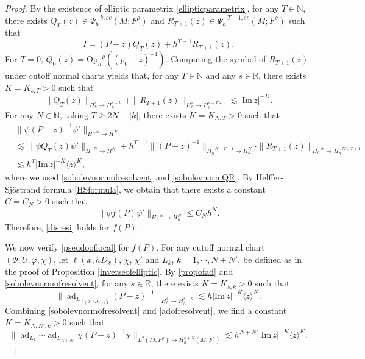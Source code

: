 \documentclass[10pt,a4paper]{amsart}
\newcommand\N{\ensuremath{\mathbb{N}}}
\newcommand\Oph{\ensuremath{\mathrm{Op}_h}}
\newcommand\R{\ensuremath{\mathbb{R}}}
\begin{document}
\begin{proof}
By the existence of elliptic parametrix \eqref{ellipticparametrix}, for any $T\in \mathbb{N}$, there exists $Q_{T}(z) \in \Psi^{-k,sc}_{h}(M;F^\rho)$ and $R_{T+1}(z) \in \Psi^{-T-1,sc}_h(M;F^\rho)$ such that
\begin{equation*}
    I=(P-z)Q_{T}(z)+h^{T+1}R_{T+1}(z) .
\end{equation*}
For $T=0$, $Q_{0}(z)=\Oph^{\rho}((p_{0}-z)^{-1})$. Computing the symbol of $R_{T+1}(z)$ under cutoff normal charts yields that, for any $T\in \N$ and any $s\in \R$, there exists $K=K_{s,T}>0$ such that
\begin{equation}\label{sobolevnormQR}
\|Q_{T}(z)\|_{H^{s}_{h}\to H^{s+k}_{h}}  + \|R_{T+1}(z)\|_{H_{h}^{s}\to H^{s+T+1}_{h}} \lesssim |\mathrm{Im}\, z|^{-K}.
\end{equation}
For any $N\in \N$, taking $T\geq 2N+|k|$, there exists $K=K_{N,T}>0$ such that
\begin{equation}
\begin{aligned}
&\|\psi  (P-z)^{-1}\psi'\|_{H^{-N}\to H^{N}}\\
& \lesssim \|\psi  Q_{T}(z)\psi' \|_{H^{-N}\to H^{N}}+h^{T+1}\|(P-z)^{-1}\|_{H_{h}^{-N+T+1}\to  H_{h}^{N}}\cdot\|R_{T+1}(z)\|_{H^{-N}_h\to H^{-N+T+1}_h} \\
&\lesssim  h^{T}|\mathrm{Im}\, z|^{-K }\langle z\rangle^{K },
\end{aligned}
\end{equation}
where we used \eqref{sobolevnormofresolvent} and \eqref{sobolevnormQR}. By Helffer-Sjöstrand formula \eqref{HSformula}, we obtain that there exists a constant $C=C_N>0$ such that
\begin{equation}\label{cutoffoffp}
\|\psi f(P) \psi'\|_{H^{-N}_h\to H^N_h}\leq C_N h^N.
\end{equation}
Therefore, \eqref{disresi} holds for $f(P)$.

We now verify \eqref{pseudooflocal} for $f(P)$. For any cutoff normal chart $(\Phi, U,\varphi,\chi)$, let $\ell(x,hD_x),\, \widetilde{\chi}$, $\chi'$ and $ L_k$, $k=1,\cdots,N+N'$, be defined as in the proof of Proposition \ref{inverseofelliptic}. By \eqref{propofad} and \eqref{sobolevnormofresolvent}, for any $s\in \R$, there exists $K=K_{s,k}>0$ such that
\begin{equation}\label{adofresolvent}
 \big\|\operatorname{ad}_{L_{\ell(x,hD_x),\widetilde{\chi}}}(P-z)^{-1} \big\|_{H^{s}_{h}\to H^{s+k}_{h}} \lesssim h|\mathrm{Im}\, z|^{-K}\langle z \rangle^{K}.
\end{equation}
Combining \eqref{sobolevnormofresolvent} and \eqref{adofresolvent}, we find a constant $K=K_{N,N',k}>0$ such that
\begin{equation}\label{adestiP-z}
\big\|\operatorname{ad}_{L_{1}} \cdots \operatorname{ad}_{L_{N+N'}} \chi (P-z)^{-1}\chi \big\|_{L^2\left(M;F^\rho\right) \rightarrow H_h^{k+N}\left(M;F^{\rho}\right)} \lesssim h^{N+N'}|\mathrm{Im}\, z|^{-K}\langle z\rangle^{K} .
\end{equation}


\end{proof}
\end{document}

